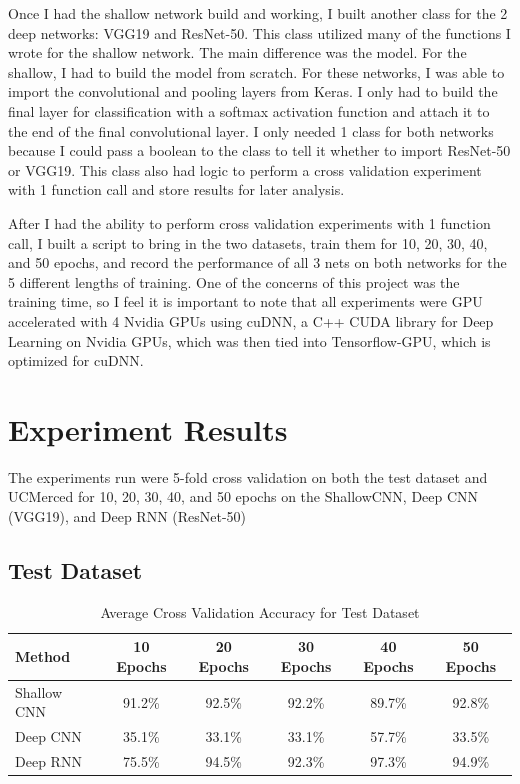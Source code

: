 \documentclass[12pt]{article}
\begin{document}
Once I had the shallow network build and working, I built another class for the 2 deep networks: VGG19 and ResNet-50. This class utilized many of the functions I wrote for the shallow network. The main difference was the model. For the shallow, I had to build the model from scratch. For these networks, I was able to import the convolutional and pooling layers from Keras. I only had to build the final layer for classification with a softmax activation function and attach it to the end of the final convolutional layer. I only needed 1 class for both networks because I could pass a boolean to the class to tell it whether to import ResNet-50 or VGG19. This class also had logic to perform a cross validation experiment with 1 function call and store results for later analysis. 

After I had the ability to perform cross validation experiments with 1 function call, I built a script to bring in the two datasets, train them for 10, 20, 30, 40, and 50 epochs, and record the performance of all 3 nets on both networks for the 5 different lengths of training. One of the concerns of this project was the training time, so I feel it is important to note that all experiments were GPU accelerated with 4 Nvidia GPUs using cuDNN, a C++ CUDA library for Deep Learning on Nvidia GPUs, which was then tied into Tensorflow-GPU, which is optimized for cuDNN. 
	
	\section{Experiment Results}
	
	The experiments run were 5-fold cross validation on  both the test dataset and UCMerced for 10, 20, 30, 40, and 50 epochs on the ShallowCNN, Deep CNN (VGG19), and Deep RNN (ResNet-50)
	\subsection{Test Dataset}

	\begin{table}[h!]
		\begin{center}
			\caption{Average Cross Validation Accuracy for Test Dataset}
			\label{table:test}
			\begin{tabular}{l | S | S | S | S |  S}
				\textbf{Method} & \textbf{10 Epochs} & \textbf{20 Epochs} & \textbf{30 Epochs} & \textbf{40 Epochs} & \textbf{50 Epochs} \\
				\hline
				Shallow CNN & 91.2\% & 92.5\% & 92.2\% & 89.7\% & 92.8\% \\
				Deep CNN & 35.1\% & 33.1\% & 33.1\% & 57.7\% & 33.5\% \\
				Deep RNN & 75.5\% & 94.5\% & 92.3\% & 97.3\% & 94.9\% \\
				
			
			\end{tabular}					
		
		
		\end{center}
	
	\end{table}
\end{document}
